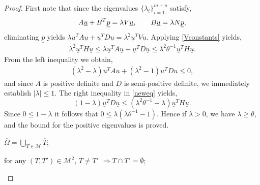 \documentclass{imamci}
\numberwithin{equation}{section}
\begin{document}
\begin{proof}
First note that since the eigenvalues $\{\lambda_{i}\}_{i=1}^{m+n}$ satisfy,
 \[
\mathnormal{A}\underline{u} + \mathnormal{B}^{T}\underline{p}
= \lambda V\underline{u},\quad \quad\mathnormal{B}\underline{u} = \lambda
\mathnormal{N}\underline{p},
 \]
eliminating $\underline{p}$ yields $\lambda \underline{u}^{T}A\underline{u}
+ \underline{u}^{T}D\underline{u} = \lambda^{2}\underline{u}^{T}V\underline{u}$.
Applying \eqref{Vconstants} yields,
\begin{eqnarray}
\label{neweq} \lambda^{2}\underline{u}^{T}H\underline{u} \le \lambda 
\underline{u}^{T}A\underline{u} + \underline{u}^{T}D\underline{u}  \le  
\lambda^{2}\theta^{-1}\underline{u}^{T}H\underline{u}.
\end{eqnarray}
From the left inequality we obtain,
\begin{eqnarray}
\label{added} \left(\lambda^{2} - \lambda\right)\underline{u}^{T}A\underline{u}
+ \left(\lambda^{2} - 1 \right)\underline{u}^{T}D\underline{u} \le  0,
\end{eqnarray}
and since $A$ is positive definite and $D$ is semi-positive definite, we
immediately establish $|\lambda| \le 1.$ The right inequality in \eqref{neweq}
yields,
 \[
\left(1 - \lambda\right) \underline{u}^{T} D
\underline{u}  \le  \left(\lambda^{2}\theta^{-1} - \lambda
\right) \underline{u}^{T} H \underline{u}.
 \]
Since $0 \le 1-\lambda $ it follows that $0  \le  \lambda \left(\lambda\theta^{-1}
- 1 \right)$. Hence if $\lambda >0$, we have $\lambda \ge \theta$, and the
bound for the positive eigenvalues is proved. 
\begin{BL}
\item $\overline{\Omega} = \bigcup_{T \in\mathcal{M}} \overline T$;

\item for any $(T,T') \in \mathcal{M}^2$, $T \not =  T'$ $ \Longrightarrow T \cap T' = \emptyset$;  


\end{BL}
\end{proof}
\end{document}
